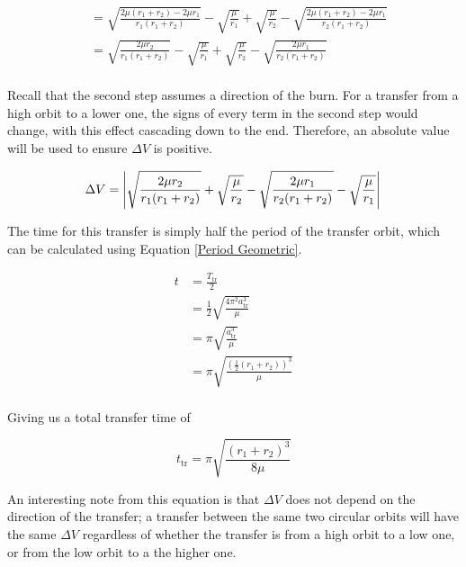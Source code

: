 \documentclass{article}
\begin{document}
\begin{align*}
             & = \sqrt{\frac{2\mu(r_1+r_2)-2\mu{}r_1}{r_1(r_1+r_2)}}-\sqrt{\frac{\mu}{r_1}}+\sqrt{\frac{\mu}{r_2}}-\sqrt{\frac{2\mu(r_1+r_2)-2\mu{}r_1}{r_2(r_1+r_2)}}                                                                           \\
             & = \sqrt{\frac{2\mu{}r_2}{r_1(r_1+r_2)}}-\sqrt{\frac{\mu}{r_1}}+\sqrt{\frac{\mu}{r_2}}-\sqrt{\frac{2\mu{}r_1}{r_2(r_1+r_2)}}                                                                                                       \\
\end{align*}

Recall that the second step assumes a direction of the burn. For a transfer from a high orbit to a lower one, the signs of every term in the second step would change, with this effect cascading down to the end. Therefore, an absolute value will be used to ensure $\Delta V$ is positive.

\begin{equation}
    \Delta V = \left|\sqrt{\frac{2\mu{}r_2}{r_1(r_1+r_2)}}+\sqrt{\frac{\mu}{r_2}}-\sqrt{\frac{2\mu{}r_1}{r_2(r_1+r_2)}}-\sqrt{\frac{\mu}{r_1}}\right|\\
\end{equation}

The time for this transfer is simply half the period of the transfer orbit, which can be calculated using Equation \eqref{Period Geometric}.

\begin{align*}
    t & = \frac{T_\text{tr}}{2}                                     \\
      & = \frac{1}{2}\sqrt{\frac{4\pi^2 a_\text{tr}^3}{\mu}}        \\
      & = \pi\sqrt{\frac{a_\text{tr}^3}{\mu}}                       \\
      & = \pi\sqrt{\frac{\left(\frac{1}{2}(r_1+r_2)\right)^3}{\mu}} \\
\end{align*}

Giving us a total transfer time of

\begin{equation}
    t_\text{tr}=\pi\sqrt{\frac{(r_1+r_2)^3}{8\mu}}
\end{equation}

An interesting note from this equation is that $\Delta V$ does not depend on the direction of the transfer; a transfer between the same two circular orbits will have the same $\Delta V$ regardless of whether the transfer is from a high orbit to a low one, or from the low orbit to a the higher one.
\end{document}
